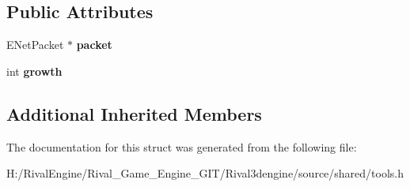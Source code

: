 \subsection*{Public Attributes}
\begin{DoxyCompactItemize}
\item 
\mbox{\label{structpacketbuf_ae6dfc97fddc8ec2687a4e6ab615fb93f}} 
E\+Net\+Packet $\ast$ {\bfseries packet}
\item 
\mbox{\label{structpacketbuf_a215fe461f926c313520a8235dfd9f7e7}} 
int {\bfseries growth}
\end{DoxyCompactItemize}
\subsection*{Additional Inherited Members}


The documentation for this struct was generated from the following file\+:\begin{DoxyCompactItemize}
\item 
H\+:/\+Rival\+Engine/\+Rival\+\_\+\+Game\+\_\+\+Engine\+\_\+\+G\+I\+T/\+Rival3dengine/source/shared/tools.\+h\end{DoxyCompactItemize}
